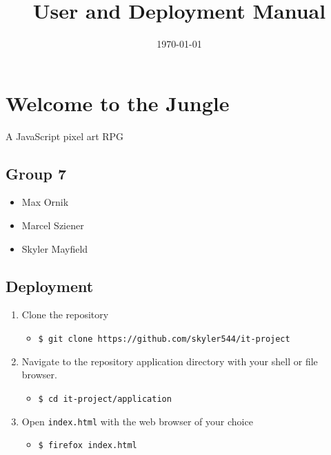 \documentclass[11pt]{article}
\date{\today}
\title{User and Deployment Manual}
\begin{document}
\maketitle


\section{Welcome to the Jungle}
\label{sec:org0cd1311}
A JavaScript pixel art RPG\\

\subsection{Group 7}
\label{sec:org2a12456}
\begin{itemize}
\item Max Ornik\\
\item Marcel Sziener\\
\item Skyler Mayfield\\
\end{itemize}

\subsection{Deployment}
\label{sec:org4617dae}
\begin{enumerate}
\item Clone the repository\\
\begin{itemize}
\item \texttt{\$ git clone https://github.com/skyler544/it-project}\\
\end{itemize}
\item Navigate to the repository application directory with your shell or file browser.\\
\begin{itemize}
\item \texttt{\$ cd it-project/application}\\
\end{itemize}
\item Open \texttt{index.html} with the web browser of your choice\\
\begin{itemize}
\item \texttt{\$ firefox index.html}\\
\end{itemize}
\end{enumerate}
\end{document}
